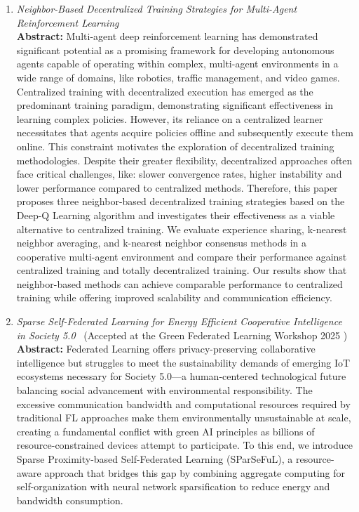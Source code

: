 \documentclass[runningheads]{llncs}
\begin{document}
\begin{enumerate}
    \item \emph{Neighbor-Based Decentralized Training Strategies for Multi-Agent Reinforcement Learning}~\cite{DBLP:conf/sac/MalucelliDAV25} \\
    \textbf{Abstract: }
    Multi-agent deep reinforcement learning has demonstrated significant potential as a promising framework for developing 
     autonomous agents capable of operating within complex, multi-agent environments  
     in a wide range of domains, like robotics, traffic management, and video games.
    Centralized training with decentralized execution has emerged as the predominant training paradigm, 
     demonstrating significant effectiveness in learning complex policies.
    However, its reliance on a centralized learner necessitates that agents acquire policies offline and subsequently 
     execute them online.
    This constraint motivates the exploration of decentralized training methodologies.
    Despite their greater flexibility, decentralized approaches often face critical challenges, like: 
     slower convergence rates, higher instability and lower performance compared to centralized methods. 
    Therefore, this paper proposes three neighbor-based decentralized training 
     strategies based on the Deep-Q Learning algorithm and investigates their effectiveness as 
     a viable alternative to centralized training. 
    We evaluate experience sharing, k-nearest neighbor averaging, and k-nearest neighbor consensus methods 
     in a cooperative multi-agent environment and compare their performance against centralized training
     and totally decentralized training. 
    Our results show that neighbor-based methods can achieve comparable performance to centralized training 
     while offering improved scalability and communication efficiency.
    
    \item \emph{Sparse Self-Federated Learning for Energy Efficient Cooperative Intelligence in Society 5.0}~\cite{DBLP:journals/corr/abs-2507-07613} 
     (Accepted at the Green Federated Learning Workshop 2025 ) \\
    \textbf{Abstract: }
    Federated Learning offers privacy-preserving collaborative intelligence but struggles to meet the sustainability demands 
     of emerging IoT ecosystems necessary for Society 5.0---a human-centered technological future balancing social advancement 
     with environmental responsibility. 
    The excessive communication bandwidth and computational resources required by traditional FL approaches make them 
     environmentally unsustainable at scale, creating a fundamental conflict with green AI principles as billions 
     of resource-constrained devices attempt to participate. 
    To this end, we introduce Sparse Proximity-based Self-Federated Learning (SParSeFuL), 
     a resource-aware approach that bridges this gap by combining aggregate computing for self-organization with neural network 
     sparsification to reduce energy and bandwidth consumption.
     

\end{enumerate}
\end{document}

